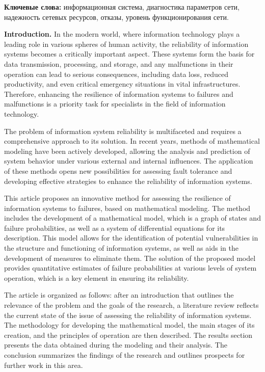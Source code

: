 \textbf{Ключевые слова:} информационная система, диагностика параметров
сети, надежность сетевых ресурсов, отказы, уровень функционирования
сети.

\textbf{Introduction.} In the modern world, where information technology
plays a leading role in various spheres of human activity, the
reliability of information systems becomes a critically important
aspect. These systems form the basis for data transmission, processing,
and storage, and any malfunctions in their operation can lead to serious
consequences, including data loss, reduced productivity, and even
critical emergency situations in vital infrastructures. Therefore,
enhancing the resilience of information systems to failures and
malfunctions is a priority task for specialists in the field of
information technology.

The problem of information system reliability is multifaceted and
requires a comprehensive approach to its solution. In recent years,
methods of mathematical modeling have been actively developed, allowing
the analysis and prediction of system behavior under various external
and internal influences. The application of these methods opens new
possibilities for assessing fault tolerance and developing effective
strategies to enhance the reliability of information systems.

This article proposes an innovative method for assessing the resilience
of information systems to failures, based on mathematical modeling. The
method includes the development of a mathematical model, which is a
graph of states and failure probabilities, as well as a system of
differential equations for its description. This model allows for the
identification of potential vulnerabilities in the structure and
functioning of information systems, as well as aids in the development
of measures to eliminate them. The solution of the proposed model
provides quantitative estimates of failure probabilities at various
levels of system operation, which is a key element in ensuring its
reliability.

The article is organized as follows: after an introduction that outlines
the relevance of the problem and the goals of the research, a literature
review reflects the current state of the issue of assessing the
reliability of information systems. The methodology for developing the
mathematical model, the main stages of its creation, and the principles
of operation are then described. The results section presents the data
obtained during the modeling and their analysis. The conclusion
summarizes the findings of the research and outlines prospects for
further work in this area.

